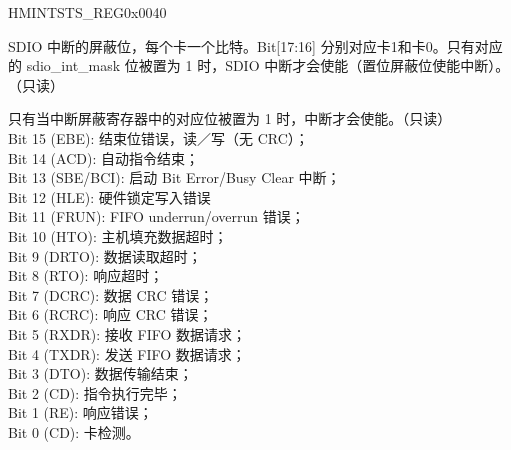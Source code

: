 \begin{register}{H}{MINTSTS\_REG}{0x0040}\label{regdesc:MINTSTSREG}
%
%
%
\regnewline%
\begin{regdesc}\begin{reglist}
\item [SDIO\_INTERRUPT\_MSK]SDIO 中断的屏蔽位，每个卡一个比特。Bit[17:16] 分别对应卡1和卡0。只有对应的 sdio\_int\_mask 位被置为 1 时，SDIO 中断才会使能（置位屏蔽位使能中断）。（只读）
\item [INT\_STATUS\_MSK]只有当中断屏蔽寄存器中的对应位被置为 1 时，中断才会使能。（只读）\\
Bit 15 (EBE): 结束位错误，读／写（无 CRC）；\\
Bit 14 (ACD): 自动指令结束；\\
Bit 13 (SBE/BCI): 启动 Bit Error/Busy Clear 中断；\\
Bit 12 (HLE): 硬件锁定写入错误\\
Bit 11 (FRUN): FIFO underrun/overrun 错误；\\
Bit 10 (HTO): 主机填充数据超时；\\
Bit 9 (DRTO): 数据读取超时；\\
Bit 8 (RTO): 响应超时； \\
Bit 7 (DCRC): 数据 CRC 错误； \\
Bit 6 (RCRC): 响应 CRC 错误； \\
Bit 5 (RXDR): 接收 FIFO 数据请求； \\
Bit 4 (TXDR): 发送 FIFO 数据请求； \\
Bit 3 (DTO): 数据传输结束； \\
Bit 2 (CD): 指令执行完毕； \\
Bit 1 (RE): 响应错误；\\
Bit 0 (CD): 卡检测。
\end{reglist}\end{regdesc}
\end{register}



